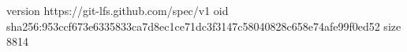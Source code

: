 version https://git-lfs.github.com/spec/v1
oid sha256:953ccf673e6335833ca7d8ec1ce71dc3f3147c58040828c658e74afe99f0ed52
size 8814
